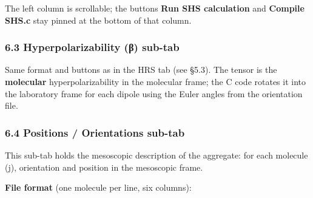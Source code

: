 The left column is scrollable; the buttons \textbf{Run SHS calculation}
and \textbf{Compile SHS.c} stay pinned at the bottom of that column.

\hypertarget{hyperpolarizability-ux3b2-sub-tab}{%
\subsubsection{6.3 Hyperpolarizability (β)
sub-tab}\label{hyperpolarizability-ux3b2-sub-tab}}

Same format and buttons as in the HRS tab (see §5.3). The tensor is the
\textbf{molecular} hyperpolarizability in the molecular frame; the C
code rotates it into the laboratory frame for each dipole using the
Euler angles from the orientation file.

\hypertarget{positions-orientations-sub-tab}{%
\subsubsection{6.4 Positions / Orientations
sub-tab}\label{positions-orientations-sub-tab}}

This sub-tab holds the mesoscopic description of the aggregate: for each
molecule (j), orientation and position in the mesoscopic frame.

\textbf{File format} (one molecule per line, six columns):

\begin{Shaded}
\begin{Highlighting}[]
\end{Highlighting}
\end{Shaded}

